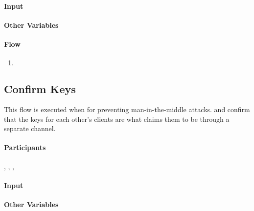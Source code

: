 \documentclass[a4paper,10pt]{article}
\begin{document}
\paragraph{Input}
\SpecialItem
\begin{description}
 \item[]
\end{description}

\paragraph{Other Variables}
\SpecialItem
\begin{description}
 \item[]
\end{description}

\paragraph{Flow}

\begin{enumerate}
 \item
\end{enumerate}

\subsection{Confirm Keys}
\label{confirm_keys_flow}
This flow is executed when for preventing man-in-the-middle attacks.  and  confirm that the keys for each other's clients are what \Server{} claims them to be 
through a separate channel.

\paragraph{Participants} , , , 

\paragraph{Input}
\SpecialItem
\begin{description}
 \item[]
\end{description}

\paragraph{Other Variables}
\SpecialItem
\begin{description}
 \item[]
\end{description}
\end{document}
